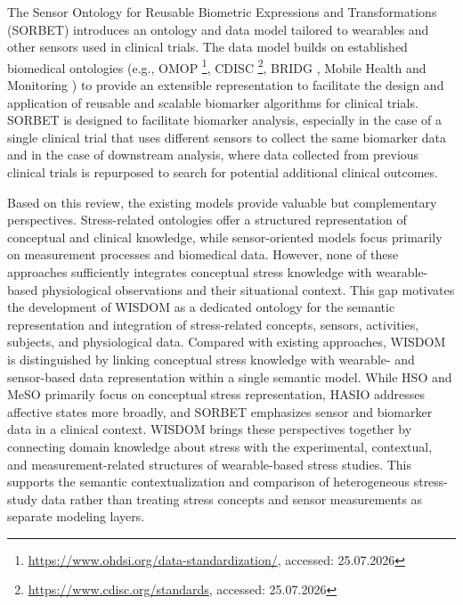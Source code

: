 \documentclass[
]{ceurart}
\begin{document}
The Sensor Ontology for Reusable Biometric Expressions and Transformations (SORBET) \cite{lyons2021towards} introduces an ontology and data model tailored to wearables and other sensors used in clinical trials. The data model builds on established biomedical ontologies (e.g., OMOP \footnote{\url{https://www.ohdsi.org/data-standardization/}, accessed: 25.07.2026}, CDISC \footnote{\url{https://www.cdisc.org/standards}, accessed: 25.07.2026}, BRIDG \cite{becnel2017bridg}, Mobile Health and Monitoring \cite{el2019mobile}) to provide an extensible representation to facilitate the design and application of reusable and scalable biomarker algorithms for clinical trials. SORBET is designed to facilitate biomarker analysis, especially in the case of a single clinical trial that uses different sensors to collect the same biomarker data and in the case of downstream analysis, where data collected from previous clinical trials is repurposed to search for potential additional clinical outcomes.

Based on this review, the existing models provide valuable but complementary perspectives. Stress-related ontologies offer a structured representation of conceptual and clinical knowledge, while sensor-oriented models focus primarily on measurement processes and biomedical data. However, none of these approaches sufficiently integrates conceptual stress knowledge with wearable-based physiological observations and their situational context. This gap motivates the development of WISDOM as a dedicated ontology for the semantic representation and integration of stress-related concepts, sensors, activities, subjects, and physiological data.
Compared with existing approaches, WISDOM is distinguished by linking conceptual stress knowledge with wearable- and sensor-based data representation within a single semantic model. While HSO and MeSO primarily focus on conceptual stress representation, HASIO addresses affective states more broadly, and SORBET emphasizes sensor and biomarker data in a clinical context. WISDOM brings these perspectives together by connecting domain knowledge about stress with the experimental, contextual, and measurement-related structures of wearable-based stress studies. This supports the semantic contextualization and comparison of heterogeneous stress-study data rather than treating stress concepts and sensor measurements as separate modeling layers. 
\end{document}
